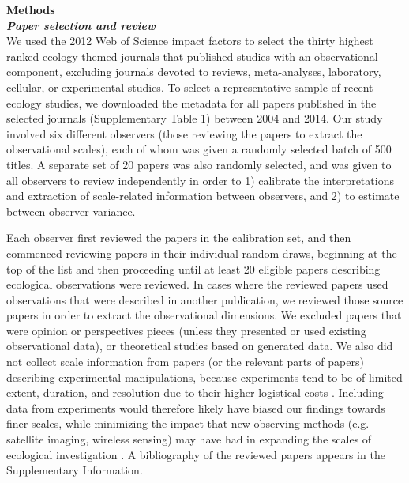 \documentclass[12pt]{article}
\begin{document}
\vspace{10pt}
\noindent \textbf{Methods}
\vspace{5pt}
\\
\noindent \textbf{\emph{Paper selection and review}}\\
We used the 2012 Web of Science impact factors to select the thirty highest ranked ecology-themed journals that published studies with an observational component, excluding journals devoted to reviews, meta-analyses, laboratory, cellular, or experimental studies.  To select a representative sample of recent ecology studies, we downloaded the metadata for all papers published in the selected journals (Supplementary Table 1) between 2004 and 2014. Our study involved six different observers (those reviewing the papers to extract the observational scales), each of whom was given a randomly selected batch of 500 titles.  A separate set of 20 papers was also randomly selected, and was given to all observers to review independently in order to 1) calibrate the interpretations and extraction of scale-related information between observers, and 2) to estimate between-observer variance.  

Each observer first reviewed the papers in the calibration set, and then commenced reviewing papers in their individual random draws, beginning at the top of the list and then proceeding until at least 20 eligible papers describing ecological observations were reviewed. In cases where the reviewed papers used observations that were described in another publication, we reviewed those source papers in order to extract the observational dimensions. We excluded papers that were opinion or perspectives pieces (unless they presented or used existing observational data), or theoretical studies based on generated data. We also did not collect scale information from papers (or the relevant parts of papers) describing experimental manipulations, because experiments tend to be of limited extent, duration, and resolution due to their higher logistical costs \cite{tilman_ecological_1989, kareiva_spatial_1988}. Including data from experiments would therefore likely have biased our findings towards finer scales, while minimizing the impact that new observing methods (e.g. satellite imaging, wireless sensing) may have had in expanding the scales of ecological investigation \cite{turner_remote_2003,pettorelli_satellite_2014,porter_wireless_2005}. A bibliography of the reviewed papers appears in the Supplementary Information. 
\end{document}
